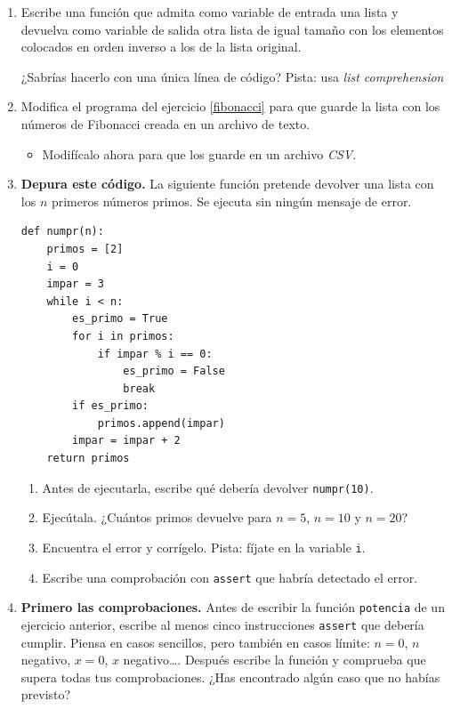 \begin{enumerate}
\item Escribe una función que admita como variable de entrada una lista y devuelva como variable de salida otra lista de igual tamaño con los elementos colocados en orden inverso a los de la lista original.

¿Sabrías hacerlo con una única línea de código? Pista: usa \emph{list comprehension}

\item Modifica el programa del ejercicio \ref{fibonacci} para que guarde la lista con los números de Fibonacci creada en un archivo de texto.
\begin{itemize}
    \item Modifícalo ahora para que los guarde en un archivo \emph{CSV}.
\end{itemize}

\item \textbf{Depura este código.} La siguiente función pretende devolver una lista con los $n$ primeros números primos. Se ejecuta sin ningún mensaje de error.
\begin{verbatim}
def numpr(n):
    primos = [2]
    i = 0
    impar = 3
    while i < n:
        es_primo = True
        for i in primos:
            if impar % i == 0:
                es_primo = False
                break
        if es_primo:
            primos.append(impar)
        impar = impar + 2
    return primos
\end{verbatim}
\begin{enumerate}
\item Antes de ejecutarla, escribe qué debería devolver \texttt{numpr(10)}.
\item Ejecútala. ¿Cuántos primos devuelve para $n=5$, $n=10$ y $n=20$?
\item Encuentra el error y corrígelo. Pista: fíjate en la variable \texttt{i}.
\item Escribe una comprobación con \texttt{assert} que habría detectado el error.
\end{enumerate}

\item \textbf{Primero las comprobaciones.} Antes de escribir la función \verb|potencia| de un ejercicio anterior, escribe al menos cinco instrucciones \texttt{assert} que debería cumplir. Piensa en casos sencillos, pero también en casos límite: $n=0$, $n$ negativo, $x=0$, $x$ negativo\ldots. Después escribe la función y comprueba que supera todas tus comprobaciones. ¿Has encontrado algún caso que no habías previsto?


\end{enumerate}
